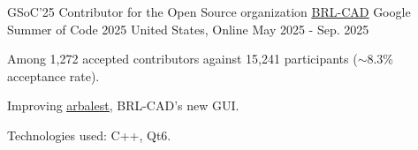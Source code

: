 

\begin{cventries}

  \cventry
    {GSoC'25 Contributor for the Open Source organization \underline{\href{https://github.com/BRL-CAD/brlcad}{BRL-CAD}}} %
    {Google Summer of Code 2025} %
    {United States, Online} %
    {May 2025 - Sep. 2025} %
    {
      \begin{cvitems} %
        \item {Among 1,272 accepted contributors against 15,241 participants ($\sim$8.3\% acceptance rate).}
        \item {Improving \underline{\href{https://github.com/BRL-CAD/arbalest}{arbalest}}, BRL-CAD's new GUI.}
        \item {Technologies used: C++, Qt6.}
      \end{cvitems}
    }

\end{cventries}
